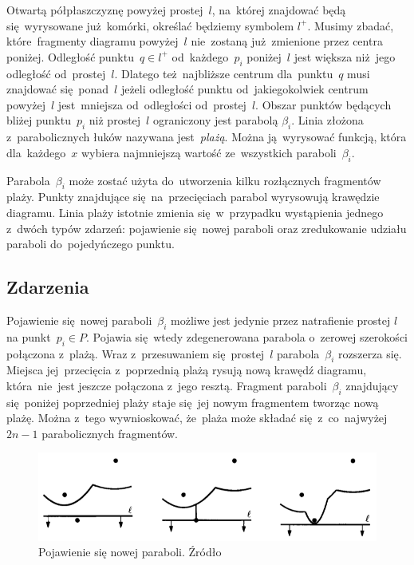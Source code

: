 \documentclass[skorowidz,autorrok,backref,xodstep,oswiadczenie]{wmimgr}
\begin{document}
Otwartą półpłaszczyznę powyżej prostej~$l$, na~której znajdować będą się~wyrysowane już~komórki, określać będziemy symbolem $l^{+}$. Musimy zbadać, które~fragmenty diagramu powyżej~$l$ nie~zostaną już~zmienione przez centra poniżej. Odległość punktu~$q \in l^{+}$ od~każdego~$p_{i}$ poniżej~$l$ jest większa niż~jego odległość od~prostej~$l$. Dlatego też~najbliższe centrum dla~punktu~$q$ musi znajdować się~ponad~$l$ jeżeli odległość punktu od~jakiegokolwiek centrum powyżej~$l$ jest~mniejsza od~odległości od~prostej~$l$. Obszar punktów będących bliżej punktu~$p_{i}$ niż prostej~$l$ ograniczony jest parabolą $\beta_{i}$. Linia złożona z~parabolicznych łuków nazywana jest~\emph{plażą}. Można ją~wyrysować funkcją, która dla~każdego~$x$ wybiera najmniejszą wartość ze~wszystkich paraboli~$\beta_{i}$.

Parabola~$\beta_{i}$ może zostać użyta do~utworzenia kilku rozłącznych fragmentów plaży. Punkty znajdujące się~na~przecięciach parabol wyrysowują krawędzie diagramu. Linia plaży istotnie zmienia się~w~przypadku wystąpienia jednego z~dwóch typów zdarzeń: pojawienie się~nowej paraboli oraz zredukowanie udziału paraboli do~pojedyńczego punktu.

\subsection{Zdarzenia}

Pojawienie się~nowej paraboli~$\beta_{i}$ możliwe jest jedynie przez natrafienie prostej $l$ na punkt~$p_{i} \in P$. Pojawia się~wtedy zdegenerowana parabola o~zerowej szerokości połączona z~plażą. Wraz z~przesuwaniem się~prostej~$l$ parabola~$\beta_{i}$ rozszerza się. Miejsca jej~przecięcia z~poprzednią plażą rysują nową krawędź diagramu, która~nie~jest jeszcze połączona z~jego resztą. Fragment paraboli~$\beta_{i}$ znajdujący się~poniżej poprzedniej plaży staje się~jej nowym fragmentem tworząc nową plażę. Można z~tego wywnioskować, że~plaża może składać się~z~co~najwyżej~$2n-1$ parabolicznych fragmentów.

\begin{figure}[ht!]
\centering
\includegraphics[width=150mm]{images/voronoi4.png}
\caption{Pojawienie się nowej paraboli. Źródło \cite{geometria}}
\label{voronoinewarc}
\end{figure}
\end{document}
